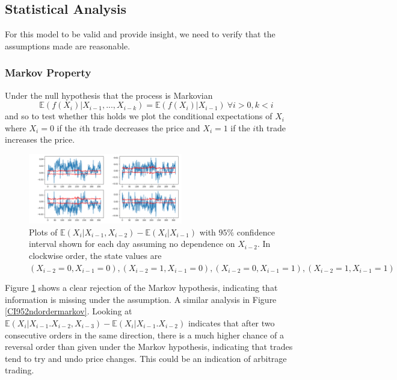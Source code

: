 \documentclass[a4paper,10pt]{article}
\begin{document}
\subsection{Statistical Analysis}
For this model to be valid and provide insight, we need to verify that the assumptions made are reasonable.
\subsubsection{Markov Property}
Under the null hypothesis that the process is Markovian 
\begin{equation}
\mathbb{E}\left(f(X_i) | X_{i-1}, ... ,X_{i - k}\right) = \mathbb{E}\left(f(X_i) | X_{i-1}\right) \ \forall i > 0, k < i
\end{equation}
and so to test whether this holds we plot the conditional expectations of $X_i$ where $X_i = 0$ if the $i$th trade decreases the price and $X_i = 1$ if the $i$th trade increases the price.  
\begin{figure}[h]
    \centering
    \includegraphics[width=0.6\textwidth]{images/markov95}
    \caption{Plots of $\mathbb{E}(X_i | X_{i-1}, X_{i-2}) - \mathbb{E}(X_i | X_{i-1})$ with $95\%$ confidence interval shown for each day assuming no dependence on $X_{i - 2}$. In clockwise order, the state values are $(X_{i - 2} = 0, X_{i - 1} = 0), (X_{i - 2} = 1, X_{i - 1} = 0), (X_{i - 2} = 0, X_{i - 1} = 1), (X_{i - 2} = 1, X_{i - 1} = 1)$}
    \label{CI95markov}
\end{figure}
Figure \ref{CI95markov} shows a clear rejection of the Markov hypothesis, indicating that information is missing under the assumption. A similar analysis in Figure \ref{CI952ndordermarkov}. Looking at $\mathbb{E}(X_i | X_{i-1}. X_{i - 2}, X_{i-3}) - \mathbb{E}(X_i | X_{i-1}. X_{i - 2})$ indicates that after two consecutive orders in the same direction, there is a much higher chance of a reversal order than given under the Markov hypothesis, indicating that trades tend to try and undo price changes. This could be an indication of arbitrage trading.
\end{document}
